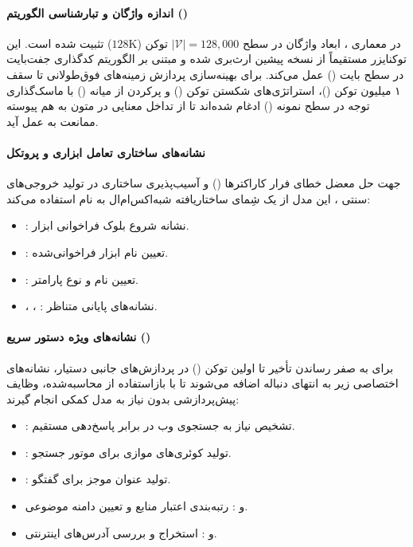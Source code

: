 \item {}

\paragraph*{اندازه واژگان و تبارشناسی الگوریتم ()}
در معماری  \cite{deepseek2026v4}، ابعاد واژگان در سطح $|\mathcal{V}| = 128{,}000$ توکن ($128\text{K}$) تثبیت شده است. این توکنایزر مستقیماً از نسخه پیشین  ارث‌بری شده و مبتنی بر الگوریتم کدگذاری جفت‌بایت در سطح بایت () عمل می‌کند. برای بهینه‌سازی پردازش زمینه‌های فوق‌طولانی تا سقف ۱ میلیون توکن ()، استراتژی‌های شکستن توکن () و پرکردن از میانه () با ماسک‌گذاری توجه در سطح نمونه () ادغام شده‌اند تا از تداخل معنایی در متون به هم پیوسته ممانعت به عمل آید.

\paragraph*{نشانه‌های ساختاری تعامل ابزاری و پروتکل }
جهت حل معضل خطای فرار کاراکترها () و آسیب‌پذیری ساختاری در تولید خروجی‌های سنتی ، این مدل از یک شِمای ساختاریافته شبه‌اکس‌ام‌ال به نام  استفاده می‌کند:
\begin{itemize}
    \item {}: نشانه شروع بلوک فراخوانی ابزار.
    \item {}: تعیین نام ابزار فراخوانی‌شده.
    \item {}: تعیین نام و نوع پارامتر.
    \item {}، ، : نشانه‌های پایانی متناظر.
\end{itemize}

\paragraph*{نشانه‌های ویژه دستور سریع ()}
برای به صفر رساندن تأخیر تا اولین توکن () در پردازش‌های جانبی دستیار، نشانه‌های اختصاصی زیر به انتهای دنباله اضافه می‌شوند تا با بازاستفاده از  محاسبه‌شده، وظایف پیش‌پردازشی بدون نیاز به مدل کمکی انجام گیرند:
\begin{itemize}
    \item {}: تشخیص نیاز به جستجوی وب در برابر پاسخ‌دهی مستقیم.
    \item {}: تولید کوئری‌های موازی برای موتور جستجو.
    \item {}: تولید عنوان موجز برای گفتگو.
    \item {} و : رتبه‌بندی اعتبار منابع و تعیین دامنه موضوعی.
    \item {} و : استخراج و بررسی آدرس‌های اینترنتی.
\end{itemize}

